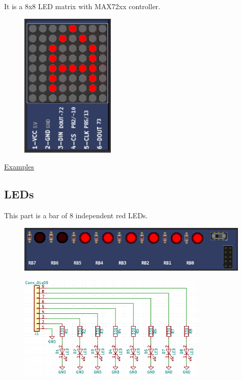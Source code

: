 It is a 8x8 LED matrix with MAX72xx controller.

\begin{figure}[H]
\center
\includegraphics[width=0.4\textwidth]{img/part_LED_matrix.png} 
\end{figure}

\href{https://lcgamboa.github.io/picsimlab_examples/examples/examples_index.html\#LED\_Matrix}{Examples}

\subsection{LEDs}

This part is a bar of 8 independent red LEDs.

\begin{figure}[H]
\center
\includegraphics[width=0.99\textwidth]{img/part_leds.png} 
\end{figure} 

\begin{figure}[H]
\center
\includegraphics[width=0.8\textwidth]{img/part_leds_.png} 
\end{figure} 


